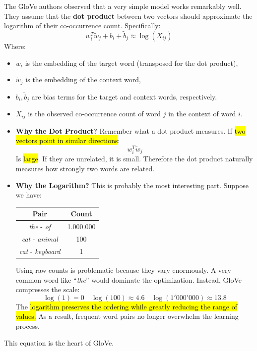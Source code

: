 \highspace
The GloVe authors observed that a very simple model works remarkably well. They assume that the \textbf{dot product} between two vectors should approximate the logarithm of their co-occurrence count. Specifically:
\begin{equation}
    w_i^T \tilde{w}_j + b_i + \tilde{b}_j \approx \log \left(X_{ij}\right)
\end{equation}
Where:
\begin{itemize}
    \item $w_i$ is the embedding of the target word (transposed for the dot product),
    
    
    \item $\tilde{w}_j$ is the embedding of the context word,
    
    
    \item $b_i, \tilde{b}_j$ are bias terms for the target and context words, respectively.
    
    
    \item $X_{ij}$ is the observed co-occurrence count of word $j$ in the context of word $i$.
    
    
    \item[\textcolor{Green3}{\faIcon{question-circle}}] \textcolor{Green3}{\textbf{Why the Dot Product?}} Remember what a dot product measures. If \hl{two vectors point in similar directions}:
    \begin{equation*}
        w_i^T \tilde{w}_{j}
    \end{equation*}
    Is \hl{large}. If they are unrelated, it is small. Therefore the dot product naturally measures how strongly two words are related.
    
    
    \item[\textcolor{Green3}{\faIcon{question-circle}}] \textcolor{Green3}{\textbf{Why the Logarithm?}} This is probably the most interesting part. Suppose we have:
    \begin{center}
        \begin{tabular}{@{} c c @{}}
            \toprule
            \textbf{Pair} & \textbf{Count} \\
            \midrule
            \emph{the} - \emph{of} & 1.000.000 \\
            \emph{cat} - \emph{animal} & 100 \\
            \emph{cat} - \emph{keyboard} & 1 \\
            \bottomrule
        \end{tabular}
    \end{center}
    Using raw counts is problematic because they vary enormously. A very common word like ``\emph{the}'' would dominate the optimization. Instead, GloVe compresses the scale:
    \begin{equation*}
        \log(1) = 0 \quad \log(100) \approx 4.6 \quad \log(1'000'000) \approx 13.8
    \end{equation*}
    The \hl{logarithm preserves the ordering while greatly reducing the range of values.} As a result, frequent word pairs no longer overwhelm the learning process.
\end{itemize}
This equation is the heart of GloVe.


